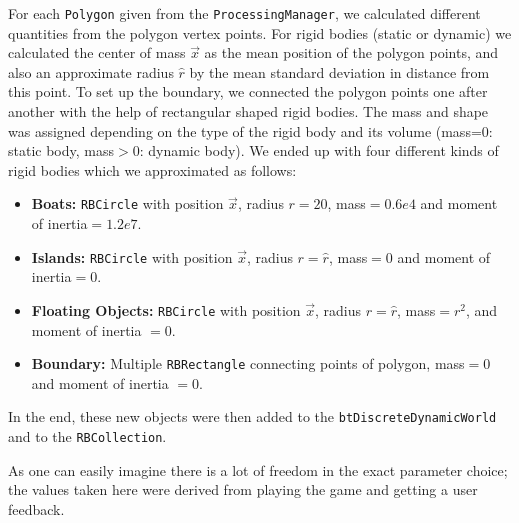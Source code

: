 For each \texttt{Polygon} given from the \texttt{ProcessingManager}, we calculated different quantities from the polygon vertex points. For rigid bodies (static or dynamic) we calculated the center of mass $\vec{x}$ as the mean position of the polygon points, and also an approximate radius $\hat{r}$ by the mean standard deviation in distance from this point. To set up the boundary, we connected the polygon points one after another with the help of rectangular shaped rigid bodies. The mass and shape was assigned depending on the type of the rigid body and its volume (mass=0: static body, mass$>$0: dynamic body). We ended up with four different kinds of rigid bodies which we approximated as follows:
\begin{itemize}
\item \textbf{Boats:} \texttt{RBCircle} with position $\vec{x}$, radius $r=20$, mass$=0.6e4$ and moment of inertia$=1.2e7$.
\item \textbf{Islands:} \texttt{RBCircle} with position $\vec{x}$, radius $r=\hat{r}$, mass$=0$ and moment of inertia$=0$.
\item \textbf{Floating Objects:} \texttt{RBCircle} with position $\vec{x}$, radius $r=\hat{r}$, mass$=r^2$, and moment of inertia $=0$.
\item \textbf{Boundary:} Multiple \texttt{RBRectangle} connecting points of polygon, mass$=0$ and moment of inertia $=0$.
\end{itemize}
In the end, these new objects were then added to the \texttt{btDiscreteDynamicWorld} and to the \texttt{RBCollection}.


As one can easily imagine there is a lot of freedom in the exact parameter choice; the values taken here were derived from playing the game and getting a user feedback.

